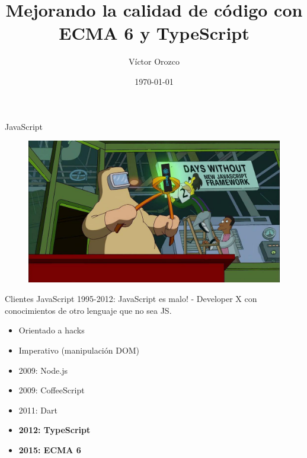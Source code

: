 \documentclass[aspectratio=169]{beamer}
\title{Mejorando la calidad de código con ECMA 6 y TypeScript}
\author{Víctor Orozco}
\institute{@tuxtor}
\date{\today}
\begin{document}
    
    
{
    \frame{\titlepage}
}

\begin{frame}{JavaScript}
\begin{figure}
	\centering
	\includegraphics[width=0.9\linewidth]{Images/jsframework}
\end{figure}
\end{frame}


\begin{frame}{Clientes JavaScript}
1995-2012: JavaScript es malo! - Developer X con conocimientos de otro lenguaje que no sea JS.
\begin{itemize}
	\item Orientado a hacks
	\item Imperativo (manipulación DOM)
\end{itemize}

\begin{itemize}
	\item 2009: Node.js
	\item 2009: CoffeeScript
	\item 2011: Dart
	\item \textbf{2012: TypeScript}
	\item \textbf{2015: ECMA 6}
\end{itemize}

\end{frame}
\end{document}
